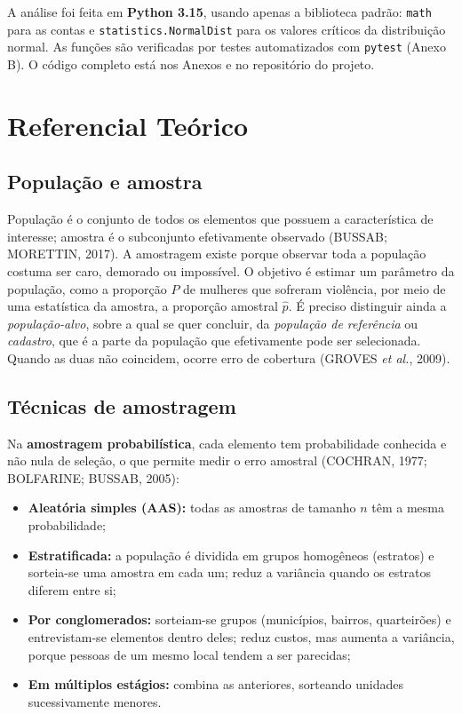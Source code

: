 \documentclass[12pt,a4paper]{article}
\begin{document}
A análise foi feita em \textbf{Python 3.15}, usando apenas a biblioteca padrão: \texttt{math} para as contas e \texttt{statistics.NormalDist} para os valores críticos da distribuição normal. As funções são verificadas por testes automatizados com \texttt{pytest} (Anexo B). O código completo está nos Anexos e no repositório do projeto.

\newpage

\section{Referencial Teórico}

\subsection{População e amostra}

População é o conjunto de todos os elementos que possuem a característica de interesse; amostra é o subconjunto efetivamente observado (BUSSAB; MORETTIN, 2017). A amostragem existe porque observar toda a população costuma ser caro, demorado ou impossível. O objetivo é estimar um parâmetro da população, como a proporção $P$ de mulheres que sofreram violência, por meio de uma estatística da amostra, a proporção amostral $\hat{p}$. É preciso distinguir ainda a \textit{população-alvo}, sobre a qual se quer concluir, da \textit{população de referência} ou \textit{cadastro}, que é a parte da população que efetivamente pode ser selecionada. Quando as duas não coincidem, ocorre erro de cobertura (GROVES \textit{et al.}, 2009).

\subsection{Técnicas de amostragem}

Na \textbf{amostragem probabilística}, cada elemento tem probabilidade conhecida e não nula de seleção, o que permite medir o erro amostral (COCHRAN, 1977; BOLFARINE; BUSSAB, 2005):

\begin{itemize}
    \item \textbf{Aleatória simples (AAS):} todas as amostras de tamanho $n$ têm a mesma probabilidade;
    \item \textbf{Estratificada:} a população é dividida em grupos homogêneos (estratos) e sorteia-se uma amostra em cada um; reduz a variância quando os estratos diferem entre si;
    \item \textbf{Por conglomerados:} sorteiam-se grupos (municípios, bairros, quarteirões) e entrevistam-se elementos dentro deles; reduz custos, mas aumenta a variância, porque pessoas de um mesmo local tendem a ser parecidas;
    \item \textbf{Em múltiplos estágios:} combina as anteriores, sorteando unidades sucessivamente menores.
\end{itemize}
\end{document}
